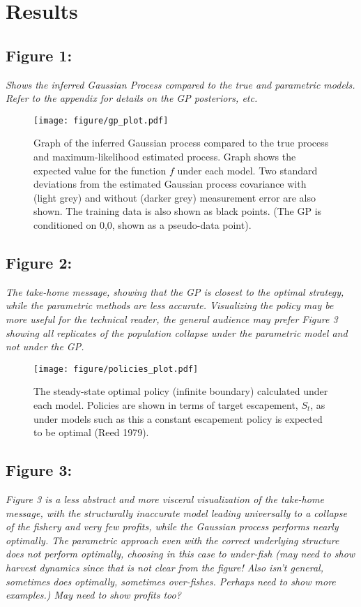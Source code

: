 \documentclass[author-year, review]{elsarticle} %
\begin{document}
\section{Results}

\subsection{Figure 1:}

\emph{Shows the inferred Gaussian Process compared to the true and
parametric models. Refer to the appendix for details on the GP
posteriors, etc.}

\begin{figure}[htbp]
\centering
\texttt{[image: figure/gp\_plot.pdf]}
\caption{Graph of the inferred Gaussian process compared to the true
process and maximum-likelihood estimated process. Graph shows the
expected value for the function $f$ under each model. Two standard
deviations from the estimated Gaussian process covariance with (light
grey) and without (darker grey) measurement error are also shown. The
training data is also shown as black points. (The GP is conditioned on
0,0, shown as a pseudo-data point).}
\end{figure}

\subsection{Figure 2:}

\emph{The take-home message, showing that the GP is closest to the
optimal strategy, while the parametric methods are less accurate.
Visualizing the policy may be more useful for the technical reader, the
general audience may prefer Figure 3 showing all replicates of the
population collapse under the parametric model and not under the GP.}

\begin{figure}[htbp]
\centering
\texttt{[image: figure/policies\_plot.pdf]}
\caption{The steady-state optimal policy (infinite boundary) calculated
under each model. Policies are shown in terms of target escapement,
$S_t$, as under models such as this a constant escapement policy is
expected to be optimal (Reed 1979).}
\end{figure}

\subsection{Figure 3:}

\emph{Figure 3 is a less abstract and more visceral visualization of the
take-home message, with the structurally inaccurate model leading
universally to a collapse of the fishery and very few profits, while the
Gaussian process performs nearly optimally. The parametric approach even
with the correct underlying structure does not perform optimally,
choosing in this case to under-fish (may need to show harvest dynamics
since that is not clear from the figure! Also isn't general, sometimes
does optimally, sometimes over-fishes. Perhaps need to show more
examples.) May need to show profits too?}
\end{document}
